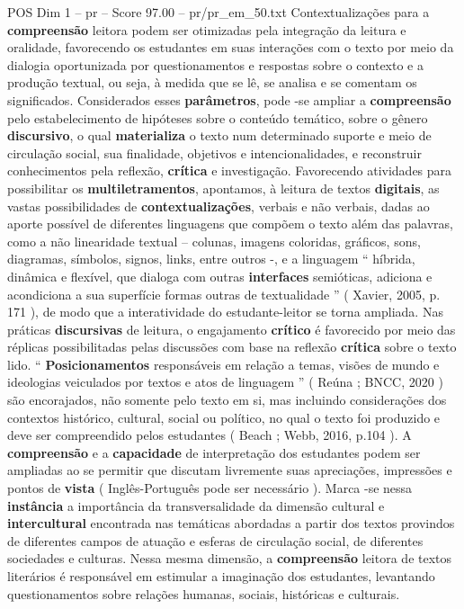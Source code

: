 \begin{textsample}{POS Dim 1 – pr – Score 97.00 – pr/pr\_em\_50.txt}
Contextualizações para a \textbf{compreensão} leitora podem ser otimizadas pela integração da leitura e oralidade, favorecendo os estudantes em suas interações com o texto por meio da dialogia oportunizada por questionamentos e respostas sobre o contexto e a produção textual, ou seja, à medida que se lê, se analisa e se comentam os significados.
Considerados esses \textbf{parâmetros}, pode -se ampliar a \textbf{compreensão} pelo estabelecimento de hipóteses sobre o conteúdo temático, sobre o gênero \textbf{discursivo}, o qual \textbf{materializa} o texto num determinado suporte e meio de circulação social, sua finalidade, objetivos e intencionalidades, e reconstruir conhecimentos pela reflexão, \textbf{crítica} e investigação.
Favorecendo atividades para possibilitar os \textbf{multiletramentos}, apontamos, à leitura de textos \textbf{digitais}, as vastas possibilidades de \textbf{contextualizações}, verbais e não verbais, dadas ao aporte possível de diferentes linguagens que compõem o texto além das palavras, como a não linearidade textual – colunas, imagens coloridas, gráficos, sons, diagramas, símbolos, signos, links, entre outros -, e a linguagem “ híbrida, dinâmica e flexível, que dialoga com outras \textbf{interfaces} semióticas, adiciona e acondiciona a sua superfície formas outras de textualidade ” ( Xavier, 2005, p. 171 ), de modo que a interatividade do estudante-leitor se torna ampliada.
Nas práticas \textbf{discursivas} de leitura, o engajamento \textbf{crítico} é favorecido por meio das réplicas possibilitadas pelas discussões com base na reflexão \textbf{crítica} sobre o texto lido. “ \textbf{Posicionamentos} responsáveis em relação a temas, visões de mundo e ideologias veiculados por textos e atos de linguagem ” ( Reúna ; BNCC, 2020 ) são encorajados, não somente pelo texto em si, mas incluindo considerações dos contextos histórico, cultural, social ou político, no qual o texto foi produzido e deve ser compreendido pelos estudantes ( Beach ; Webb, 2016, p.104 ).
A \textbf{compreensão} e a \textbf{capacidade} de interpretação dos estudantes podem ser ampliadas ao se permitir que discutam livremente suas apreciações, impressões e pontos de \textbf{vista} ( Inglês-Português pode ser necessário ).
Marca -se nessa \textbf{instância} a importância da transversalidade da dimensão cultural e \textbf{intercultural} encontrada nas temáticas abordadas a partir dos textos provindos de diferentes campos de atuação e esferas de circulação social, de diferentes sociedades e culturas.
Nessa mesma dimensão, a \textbf{compreensão} leitora de textos literários é responsável em estimular a imaginação dos estudantes, levantando questionamentos sobre relações humanas, sociais, históricas e culturais.

\end{textsample}
